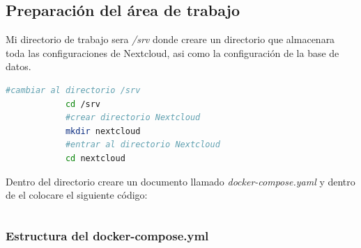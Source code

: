 			\subsection{Preparación del área de trabajo}
				
				Mi directorio de trabajo sera \textit{/srv} donde creare un directorio que almacenara toda las configuraciones de Nextcloud, asi como la configuración de la base de datos.
				
				\begin{lstlisting}[language=Bash,caption=Directorio de trabajo NextCloud]
			#cambiar al directorio /srv
			cd /srv
			#crear directorio Nextcloud
			mkdir nextcloud
			#entrar al directorio Nextcloud
			cd nextcloud
				\end{lstlisting}
			
				Dentro del directorio creare un documento llamado \textit{docker-compose.yaml} y dentro de el colocare el siguiente código:
	
				\inputminted{yaml}{documentos/docker/nextcloud/docker-compose.yml}
			
				\subsubsection{Estructura del docker-compose.yml}\label{estructura-docker}
				
